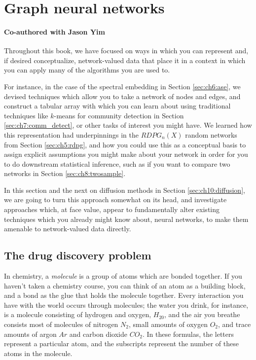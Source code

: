 \section{Graph neural networks}
\label{sec:ch10:gnns}
\paragraph*{Co-authored with Jason Yim}

Throughout this book, we have focused on ways in which you can represent and, if desired conceptualize, network-valued data that place it in a context in which you can apply many of the algorithms you are used to. 

For instance, in the case of the spectral embedding in Section \ref{sec:ch6:ase}, we devised techniques which allow you to take a network of nodes and edges, and construct a tabular array with which you can learn about using traditional techniques like $k$-means for community detection in Section \ref{sec:ch7:comm_detect}, or other tasks of interest you might have. We learned how this representation had underpinnings in the $RDPG_n(X)$ random networks from Section \ref{sec:ch5:rdpg}, and how you could use this as a conceptual basis to assign explicit assumptions you might make about your network in order for you to do downstream statistical inference, such as if you want to compare two networks in Section \ref{sec:ch8:twosample}. 

In this section and the next on diffusion methods in Section \ref{sec:ch10:diffusion}, we are going to turn this approach somewhat on its head, and investigate approaches which, at face value, appear to fundamentally alter existing techniques which you already might know about, neural networks, to make them amenable to network-valued data directly.
\subsection{The drug discovery problem}

In chemistry, a \textit{molecule} is a group of atoms which are bonded together. If you haven't taken a chemistry course, you can think of an atom as a building block, and a bond as the glue that holds the molecule together. Every interaction you have with the world occurs through molecules; the water you drink, for instance, is a molecule consisting of hydrogen and oxygen, $H_20$, and the air you breathe consists most of molecules of nitrogen $N_2$, small amounts of oxygen $O_2$, and trace amounts of argon $Ar$ and carbon dioxide $CO_2$. In these formulas, the letters represent a particular atom, and the subscripts represent the number of these atoms in the molecule.


